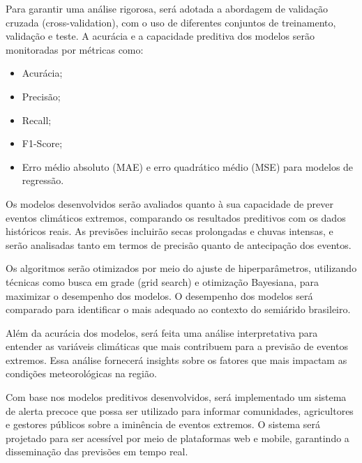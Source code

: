 \documentclass{projetodepesquisa} %
\begin{document}
	Para garantir uma análise rigorosa, será adotada a abordagem de validação cruzada (cross-validation), com o uso de diferentes conjuntos de treinamento, validação e teste. A acurácia e a capacidade preditiva dos modelos serão monitoradas por métricas como:
	
	\begin{itemize}
		\item Acurácia;
		\item Precisão;
		\item Recall;
		\item F1-Score;
		\item Erro médio absoluto (MAE) e erro quadrático médio (MSE) para modelos de regressão.
	\end{itemize}
	
	\label{sec:analise_avaliacao_modelos}
	\label{sec:avaliacao_desempenho}
	Os modelos desenvolvidos serão avaliados quanto à sua capacidade de prever eventos climáticos extremos, comparando os resultados preditivos com os dados históricos reais. As previsões incluirão secas prolongadas e chuvas intensas, e serão analisadas tanto em termos de precisão quanto de antecipação dos eventos.
	
	\label{sec:ajuste_hiperparametros}
	Os algoritmos serão otimizados por meio do ajuste de hiperparâmetros, utilizando técnicas como busca em grade (grid search) e otimização Bayesiana, para maximizar o desempenho dos modelos. O desempenho dos modelos será comparado para identificar o mais adequado ao contexto do semiárido brasileiro.
	
	\label{sec:interpretacao_resultados}
	Além da acurácia dos modelos, será feita uma análise interpretativa para entender as variáveis climáticas que mais contribuem para a previsão de eventos extremos. Essa análise fornecerá insights sobre os fatores que mais impactam as condições meteorológicas na região.
	
	\label{sec:sistema_alerta_precoce}
	\label{sec:implementacao_sistema_alerta}
	Com base nos modelos preditivos desenvolvidos, será implementado um sistema de alerta precoce que possa ser utilizado para informar comunidades, agricultores e gestores públicos sobre a iminência de eventos extremos. O sistema será projetado para ser acessível por meio de plataformas web e mobile, garantindo a disseminação das previsões em tempo real.
	
\end{document}
